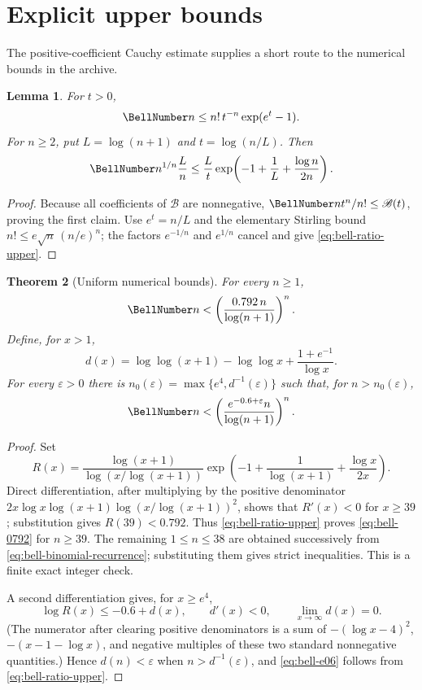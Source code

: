 \documentclass[11pt,a4paper,oneside,openany]{book}
\newtheorem{theorem}{Theorem}[chapter]
\newtheorem{lemma}[theorem]{Lemma}
\theoremstyle{definition}
\theoremstyle{remark}
\begin{document}
\section{Explicit upper bounds}
The positive-coefficient Cauchy estimate supplies a short route to the numerical
bounds in the archive.
\begin{lemma}\label{lem:bell-coeff-upper}
For $t>0$,
\begin{equation}\label{eq:bell-coeff-upper}
 \BellNumber n\le n!\,t^{-n}\exp(e^t-1).
\end{equation}
For $n\ge2$, put $L=\log(n+1)$ and $t=\log(n/L)$.  Then
\begin{equation}\label{eq:bell-ratio-upper}
 \BellNumber n^{1/n}\frac{L}{n}
 \le \frac{L}{t}
 \exp\!\left(-1+\frac1L+\frac{\log n}{2n}\right).
\end{equation}
\end{lemma}
\begin{proof}
Because all coefficients of $\mathscr B$ are nonnegative,
$\BellNumber n t^n/n!\le\mathscr B(t)$, proving the first claim.  Use
$e^t=n/L$ and the elementary Stirling bound
$n!\le e\sqrt n\,(n/e)^n$; the factors $e^{-1/n}$ and $e^{1/n}$ cancel and give
\eqref{eq:bell-ratio-upper}.
\end{proof}

\begin{theorem}[Uniform numerical bounds]\label{thm:bell-numerical-bounds}
For every $n\ge1$,
\begin{equation}\label{eq:bell-0792}
 \BellNumber n<\left(\frac{0.792\,n}{\log(n+1)}\right)^n.
\end{equation}
Define, for $x>1$,
\begin{equation}\label{eq:bell-dx}
 d(x)=\log\log(x+1)-\log\log x+\frac{1+e^{-1}}{\log x}.
\end{equation}
For every $\varepsilon>0$ there is
$n_0(\varepsilon)=\max\{e^4,d^{-1}(\varepsilon)\}$ such that, for
$n>n_0(\varepsilon)$,
\begin{equation}\label{eq:bell-e06}
 \BellNumber n<\left(\frac{e^{-0.6+\varepsilon}n}{\log(n+1)}\right)^n.
\end{equation}
\end{theorem}
\begin{proof}
Set
\[
 R(x)=\frac{\log(x+1)}{\log(x/\log(x+1))}
 \exp\!\left(-1+\frac1{\log(x+1)}+\frac{\log x}{2x}\right).
\]
Direct differentiation, after multiplying by the positive denominator
$2x\log x\log(x+1)\log(x/\log(x+1))^2$, shows that $R'(x)<0$ for $x\ge39$;
substitution gives $R(39)<0.792$.  Thus
\eqref{eq:bell-ratio-upper} proves \eqref{eq:bell-0792} for $n\ge39$.  The
remaining $1\le n\le38$ are obtained successively from
\eqref{eq:bell-binomial-recurrence}; substituting them gives strict inequalities.
This is a finite exact integer check.

A second differentiation gives, for $x\ge e^4$,
\[
 \log R(x)\le-0.6+d(x),\qquad d'(x)<0,\qquad \lim_{x\to\infty}d(x)=0.
\]
(The numerator after clearing positive denominators is a sum of
$-(\log x-4)^2$, $-(x-1-\log x)$, and negative multiples of these two standard
nonnegative quantities.)  Hence $d(n)<\varepsilon$ when
$n>d^{-1}(\varepsilon)$, and \eqref{eq:bell-e06} follows from
\eqref{eq:bell-ratio-upper}.
\end{proof}
\end{document}
